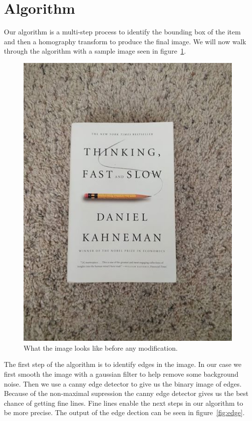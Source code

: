 \section{Algorithm}
\label{sec:algorithm}

Our algorithm is a multi-step process to identify the bounding box of the item and then a homography transform to produce the final image.
We will now walk through the algorithm with a sample image seen in figure~\ref{fig:normal}.

\begin{figure}[t]
\begin{center}
   \includegraphics[width=0.8\linewidth]{figures/normal.jpg}
\end{center}
\caption{What the image looks like before any modification.}
\label{fig:normal}
\end{figure}

The first step of the algorithm is to identify edges in the image.
In our case we first smooth the image with a gaussian filter to help remove some background noise.
Then we use a canny edge detector to give us the binary image of edges.
Because of the non-maximal supression the canny edge detector gives us the best chance of getting fine lines.
Fine lines enable the next steps in our algorithm to be more precise.
The output of the edge dection can be seen in figure~\ref{fig:edge}.

